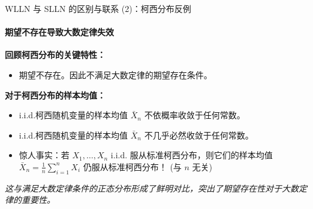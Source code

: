 \documentclass[UTF8]{beamer}
\begin{document}
\begin{frame}[shrink=5]{WLLN 与 SLLN 的区别与联系 (2)：柯西分布反例}
    \framesubtitle{期望不存在导致大数定律失效}
    \textbf{回顾柯西分布的关键特性：}
     \begin{itemize}
        \item 期望\alert{不存在}。因此不满足大数定律的期望存在条件。
    \end{itemize}
    \pause
    \textbf{对于柯西分布的样本均值：}
    \begin{itemize}
        \item i.i.d.柯西随机变量的样本均值 $\bar{X}_n$ \alert{不}依概率收敛于任何常数。
        \item i.i.d.柯西随机变量的样本均值 $\bar{X}_n$ \alert{不}几乎必然收敛于任何常数。
        \item \alert{惊人事实}：若 $X_1, \dots, X_n$ i.i.d. 服从标准柯西分布，则它们的样本均值 $\bar{X}_n = \frac{1}{n} \sum_{i=1}^n X_i$ \alert{仍服从标准柯西分布}！ (与 $n$ 无关)
    \end{itemize}
    \vspace{0.3cm}
    \textit{这与满足大数定律条件的正态分布形成了鲜明对比，突出了期望存在性对于大数定律的重要性。}
\end{frame}
\end{document}
